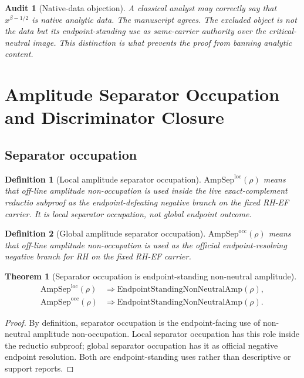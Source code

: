 \documentclass[11pt]{article}
\newtheorem{definition}{Definition}[section]
\newtheorem{theorem}{Theorem}[section]
\newtheorem{audit}{Audit}[section]
\newcommand{\AmpSepOcc}{\mathrm{AmpSep}^{\mathrm{occ}}}
\newcommand{\AmpSepLoc}{\mathrm{AmpSep}^{\mathrm{loc}}}
\newcommand{\AmpStand}{\mathrm{EndpointStandingNonNeutralAmp}}
\begin{document}
\begin{audit}[Native-data objection]
A classical analyst may correctly say that \(x^{\beta-1/2}\) is native analytic data.  The manuscript agrees.  The excluded object is not the data but its endpoint-standing use as same-carrier authority over the critical-neutral image.  This distinction is what prevents the proof from banning analytic content.
\end{audit}

\section{Amplitude Separator Occupation and Discriminator Closure}

\subsection{Separator occupation}

\begin{definition}[Local amplitude separator occupation]
\(\AmpSepLoc(\rho)\) means that off-line amplitude non-occupation is used inside the live exact-complement reductio subproof as the endpoint-defeating negative branch on the fixed RH-EF carrier.  It is local separator occupation, not global endpoint outcome.
\end{definition}

\begin{definition}[Global amplitude separator occupation]
\(\AmpSepOcc(\rho)\) means that off-line amplitude non-occupation is used as the official endpoint-resolving negative branch for RH on the fixed RH-EF carrier.
\end{definition}

\begin{theorem}[Separator occupation is endpoint-standing non-neutral amplitude]
\[
\begin{aligned}
\AmpSepLoc(\rho)&\Rightarrow \AmpStand(\rho),\\
\AmpSepOcc(\rho)&\Rightarrow \AmpStand(\rho).
\end{aligned}
\]
\end{theorem}

\begin{proof}
By definition, separator occupation is the endpoint-facing use of non-neutral amplitude non-occupation.  Local separator occupation has this role inside the reductio subproof; global separator occupation has it as official negative endpoint resolution.  Both are endpoint-standing uses rather than descriptive or support reports.
\end{proof}
\end{document}

